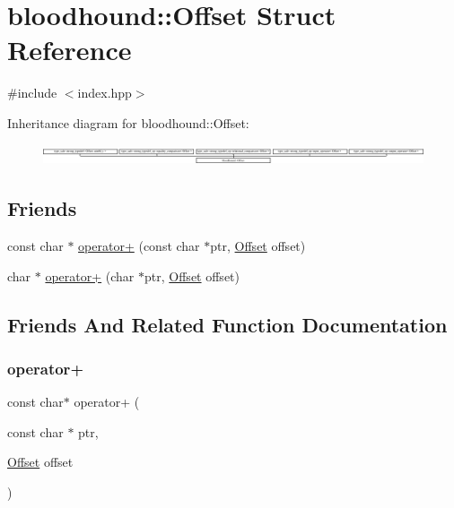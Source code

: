 \hypertarget{structbloodhound_1_1Offset}{}\section{bloodhound\+:\+:Offset Struct Reference}
\label{structbloodhound_1_1Offset}


{\ttfamily \#include $<$index.\+hpp$>$}

Inheritance diagram for bloodhound\+:\+:Offset\+:\begin{figure}[H]
\begin{center}
\leavevmode
\includegraphics[height=0.598930cm]{structbloodhound_1_1Offset}
\end{center}
\end{figure}
\subsection*{Friends}
\begin{DoxyCompactItemize}
\item 
const char $\ast$ \mbox{\hyperlink{structbloodhound_1_1Offset_aaed86d39530be98502fa1560b323d07b}{operator+}} (const char $\ast$ptr, \mbox{\hyperlink{structbloodhound_1_1Offset}{Offset}} offset)
\item 
char $\ast$ \mbox{\hyperlink{structbloodhound_1_1Offset_aec6c323c060e7a7cae481422f1ecea7a}{operator+}} (char $\ast$ptr, \mbox{\hyperlink{structbloodhound_1_1Offset}{Offset}} offset)
\end{DoxyCompactItemize}


\subsection{Friends And Related Function Documentation}
\mbox{\label{structbloodhound_1_1Offset_aaed86d39530be98502fa1560b323d07b}} 
\subsubsection{\texorpdfstring{operator+}{operator+}\hspace{0.1cm}{\footnotesize\ttfamily [1/2]}}
{\footnotesize\ttfamily const char$\ast$ operator+ (\begin{DoxyParamCaption}\item[{const char $\ast$}]{ptr,  }\item[{\mbox{\hyperlink{structbloodhound_1_1Offset}{Offset}}}]{offset }\end{DoxyParamCaption})\hspace{0.3cm}{\ttfamily [friend]}}

